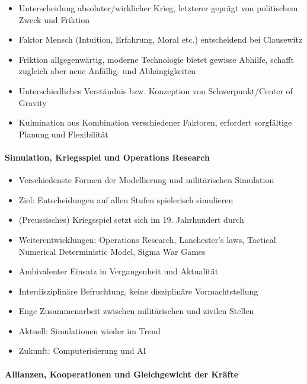 {}\documentclass[a4paper]{article}
\providecommand{\tightlist}{\setlength{\itemsep}{1mm}\setlength{\parskip}{1mm}}
\begin{document}
\begin{itemize}
	\tightlist
	\item
	      Unterscheidung absoluter/wirklicher Krieg, letzterer geprägt von
	      politischem Zweck und Friktion
	\item
	      Faktor Mensch (Intuition, Erfahrung, Moral etc.) entscheidend bei
	      Clausewitz
	\item
	      Friktion allgegenwärtig, moderne Technologie bietet gewisse Abhilfe,
	      schafft zugleich aber neue Anfällig- und Abhängigkeiten
	\item
	      Unterschiedliches Verständnis bzw. Konzeption von Schwerpunkt/Center
	      of Gravity
	\item
	      Kulmination aus Kombination verschiedener Faktoren, erfordert
	      sorgfältige Planung und Flexibilität
\end{itemize}

\paragraph{Simulation, Kriegsspiel und Operations
	Research}\label{simulation-kriegsspiel-und-operations-research}

\begin{itemize}
	\tightlist
	\item
	      Verschiedenste Formen der Modellierung und militärischen Simulation
	\item
	      Ziel: Entscheidungen auf allen Stufen spielerisch simulieren
	\item
	      (Preussisches) Kriegsspiel setzt sich im 19. Jahrhundert durch
	\item
	      Weiterentwicklungen: Operations Research, Lanchester's laws, Tactical
	      Numerical Deterministic Model, Sigma War Games
	\item
	      Ambivalenter Einsatz in Vergangenheit und Aktualität
	\item
	      Interdisziplinäre Befruchtung, keine disziplinäre Vormachtstellung
	\item
	      Enge Zusammenarbeit zwischen militärischen und zivilen Stellen
	\item
	      Aktuell: Simulationen wieder im Trend
	\item
	      Zukunft: Computerisierung und AI
\end{itemize}

\paragraph{Allianzen, Kooperationen und Gleichgewicht der
	Kräfte}\label{allianzen-kooperationen-und-gleichgewicht-der-kruxe4fte}
\end{document}
